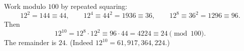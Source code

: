 Work modulo $100$ by repeated squaring:
\[
12^2=144\equiv44,\qquad 12^4\equiv44^2=1936\equiv36,\qquad 12^8\equiv36^2=1296\equiv96 .
\]
Then
\[
12^{10}=12^8\cdot12^2\equiv96\cdot44=4224\equiv24\pmod{100}.
\]
The remainder is $\boxed{24}$. (Indeed $12^{10}=61{,}917{,}364{,}224$.)
